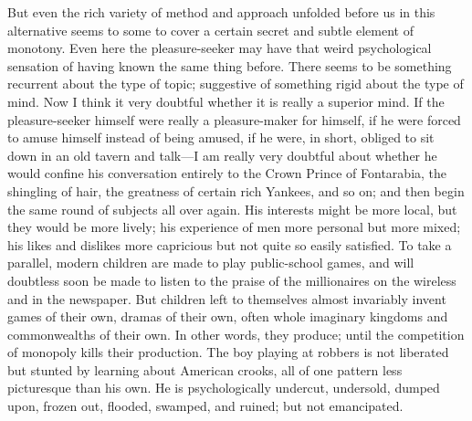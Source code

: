 \documentclass{book}
\begin{document}
But even the rich variety of method and approach unfolded before us in this alternative seems to some to cover a certain secret and subtle element of monotony. Even here the pleasure-seeker may have that weird psychological sensation of having known the same thing before. There seems to be something recurrent about the type of topic; suggestive of something rigid about the type of mind. Now I think it very doubtful whether it is really a superior mind. If the pleasure-seeker himself were really a pleasure-maker for himself, if he were forced to amuse himself instead of being amused, if he were, in short, obliged to sit down in an old tavern and talk—I am really very doubtful about whether he would confine his conversation entirely to the Crown Prince of Fontarabia, the shingling of hair, the greatness of certain rich Yankees, and so on; and then begin the same round of subjects all over again. His interests might be more local, but they would be more lively; his experience of men more personal but more mixed; his likes and dislikes more capricious but not quite so easily satisfied. To take a parallel, modern children are made to play public-school games, and will doubtless soon be made to listen to the praise of the millionaires on the wireless and in the newspaper. But children left to themselves almost invariably invent games of their own, dramas of their own, often whole imaginary kingdoms and commonwealths of their own. In other words, they produce; until the competition of monopoly kills their production. The boy playing at robbers is not liberated but stunted by learning about American crooks, all of one pattern less picturesque than his own. He is psychologically undercut, undersold, dumped upon, frozen out, flooded, swamped, and ruined; but not emancipated.
\end{document}
